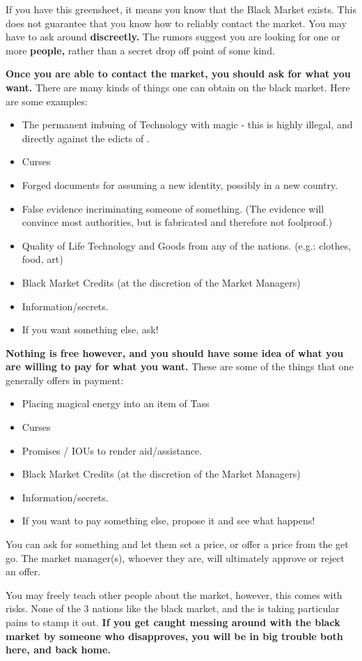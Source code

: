 \documentclass[green]{GL2020}
\begin{document}
\name{\gBMUse{}}

If you have this greensheet, it means you know that the Black Market exists. This does not guarantee that you know how to reliably contact the market. You may have to ask around \textbf{discreetly.} The rumors suggest you are looking for one or more \textbf{people,} rather than a secret drop off point of some kind.

\textbf{Once you are able to contact the market, you should ask for what you want.} There are many kinds of things one can obtain on the black market. Here are some examples:
\begin{itemize}
  \item The permanent imbuing of Technology with magic - this is highly illegal, and directly against the edicts of \cTechGod{}.
  \item Curses
  \item Forged documents for assuming a new identity, possibly in a new country.
  \item False evidence incriminating someone of something. (The evidence will convince most authorities, but is fabricated and therefore not foolproof.)
  \item Quality of Life Technology and Goods from any of the nations. (e.g.: clothes, food, art)
  \item Black Market Credits (at the discretion of the Market Managers)
  \item Information/secrets.
  \item If you want something else, ask!
\end{itemize}

\textbf{Nothing is free however, and you should have some idea of what you are willing to pay for what you want.} These are some of the things that one generally offers in payment:
\begin{itemize}
  \item Placing magical energy into an item of Tass
  \item Curses
  \item Promises / IOUs to render aid/assistance.
  \item Black Market Credits (at the discretion of the Market Managers)
  \item Information/secrets.
  \item If you want to pay something else, propose it and see what happens!
\end{itemize}

You can ask for something and let them set a price, or offer a price from the get go. The market manager(s), whoever they are, will ultimately approve or reject an offer.

You may freely teach other people about the market, however, this comes with risks. None of the 3 nations like the black market, and the \pTech{} is taking particular pains to stamp it out. \textbf{If you get caught messing around with the black market by someone who disapproves, you will be in big trouble both here, and back home.}
\end{document}
